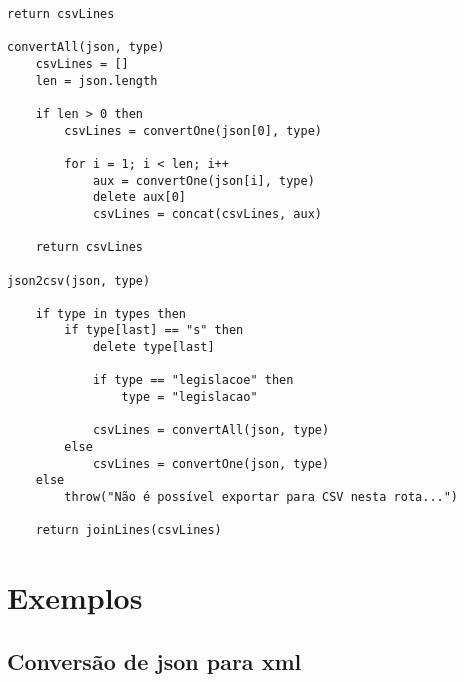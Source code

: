 \begin{lstlisting}[language=pseudocode, caption=Algoritmo de conversão de \acrshort{json} para \acrshort{csv}]
    return csvLines

convertAll(json, type)
    csvLines = []
    len = json.length

    if len > 0 then
        csvLines = convertOne(json[0], type)

        for i = 1; i < len; i++
            aux = convertOne(json[i], type)
            delete aux[0]
            csvLines = concat(csvLines, aux)

    return csvLines

json2csv(json, type)

    if type in types then
        if type[last] == "s" then
            delete type[last]

            if type == "legislacoe" then
                type = "legislacao"

            csvLines = convertAll(json, type)
        else
            csvLines = convertOne(json, type)
    else
        throw("Não é possível exportar para CSV nesta rota...")

    return joinLines(csvLines)
\end{lstlisting}

\chapter{Exemplos}

\section{Conversão de \acrshort{json} para \acrshort{xml}}\label{conv:jsonTOxml}

